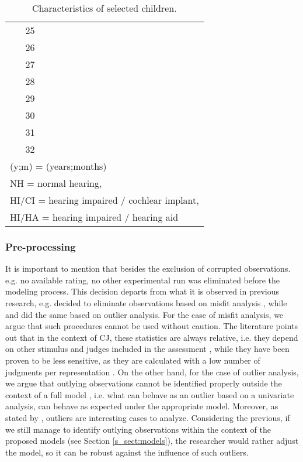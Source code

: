 \begin{table}[h!]
\begin{tabular}{|| c | cccccc || }
		25 &  &  &  &  &  & \\
		26 &  &  &  &  &  & \\
		27 &  &  &  &  &  & \\
		28 &  &  &  &  &  & \\
		29 &  &  &  &  &  & \\
		30 &  &  &  &  &  & \\
		31 &  &  &  &  &  & \\ 
		32 &  &  &  &  &  & \\ 
		\hline
		\multicolumn{7}{l}{\footnotesize{(y;m) = (years;months)}} \\
		\multicolumn{7}{l}{\footnotesize{NH = normal hearing,}} \\
		\multicolumn{7}{l}{\footnotesize{HI/CI = hearing impaired / cochlear implant,}} \\
		\multicolumn{7}{l}{\footnotesize{HI/HA = hearing impaired / hearing aid}}
	\end{tabular}
	\caption{Characteristics of selected children.}
	\label{tab:children_char}
\end{table}
%
%
\subsubsection{Pre-processing} \label{ss_sect:preproc}
%
It is important to mention that besides the exclusion of corrupted observations. e.g. no available rating, no other experimental run was eliminated before the modeling process. This decision departs from what it is observed in previous research, e.g. \citet{Boonen_et_al_2020} decided to eliminate observations based on misfit analysis \citep{Lesterhuis_2018}, while \citet{vanDaal_2020} and \citet{Boonen_et_al_2021} did the same based on outlier analysis. For the case of misfit analysis, we argue that such procedures cannot be used without caution. The literature points out that in the context of CJ, these statistics are always relative, i.e. they depend on other stimulus and judges included in the assessment \citep{Pollitt_2012a, Pollitt_2012b}, while they have been proven to be less sensitive, as they are calculated with a low number of judgments per representation \citep{Pollitt_2012a}. On the other hand, for the case of outlier analysis, we argue that outlying observations cannot be identified properly outside the context of a full model \citep{McElreath_2020}, i.e. what can behave as an outlier based on a univariate analysis, can behave as expected under the appropriate model. Moreover, as stated by \citet{McElreath_2020}, outliers are interesting cases to analyze. Considering the previous, if we still manage to identify outlying observations within the context of the proposed models (see Section \ref{s_sect:models}), the researcher would rather adjust the model, so it can be robust against the influence of such outliers.
%
%
